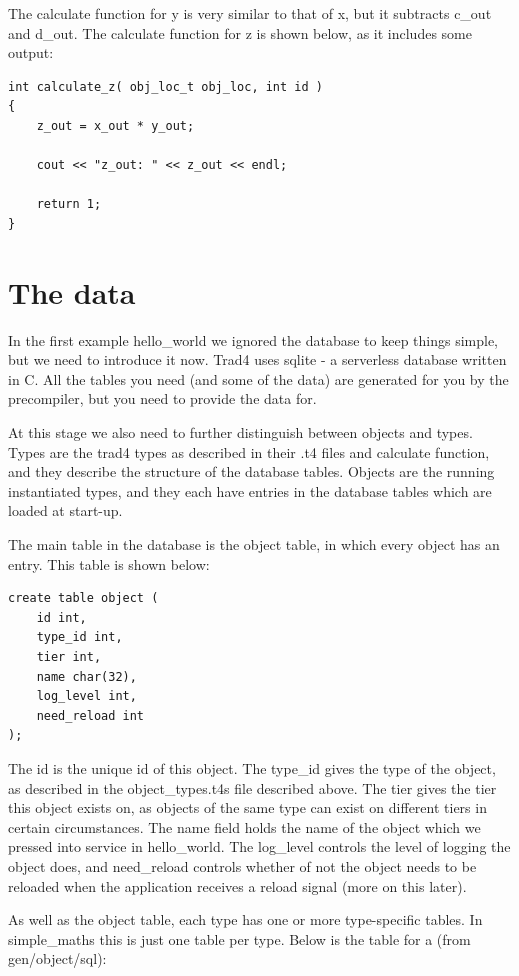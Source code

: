 \documentclass{report}
\begin{document}
The calculate function for y is very similar to that of x, but it subtracts c_out and d_out. The calculate function for z is shown below, as it includes some output:

\begin{verbatim}
int calculate_z( obj_loc_t obj_loc, int id )
{
    z_out = x_out * y_out;

    cout << "z_out: " << z_out << endl;

    return 1;
}
\end{verbatim}

\section{The data}
\label{sec:The data}

In the first example hello_world we ignored the database to keep things simple, but we need to introduce it now. Trad4 uses sqlite - a serverless database written in C. All the tables you need (and some of the data) are generated for you by the precompiler, but you need to provide the data for.

At this stage we also need to further distinguish between objects and types. Types are the trad4 types as described in their .t4 files and calculate function, and they describe the structure of the database tables. Objects are the running instantiated types, and they each have entries in the database tables which are loaded at start-up.

The main table in the database is the object table, in which every object has an entry. This table is shown below:
 
\begin{verbatim}
create table object (
    id int, 
    type_id int,
    tier int,
    name char(32),
    log_level int,
    need_reload int
);
\end{verbatim}

The id is the unique id of this object. The type_id gives the type of the object, as described in the object_types.t4s file described above. The tier gives the tier this object exists on, as objects of the same type can exist on different tiers in certain circumstances. The name field holds the name of the object which we pressed into service in hello_world. The log_level controls the level of logging the object does, and need_reload controls whether of not the object needs to be reloaded when the application receives a reload signal (more on this later).

As well as the object table, each type has one or more type-specific tables. In simple_maths this is just one table per type. Below is the table for a (from gen/object/sql):
\end{document}
